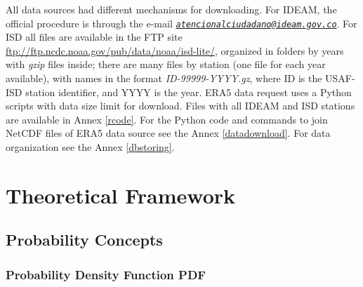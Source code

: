 \documentclass[12pt,twoside]{reedthesis}
\begin{document}
All data sources had different mechanisms for downloading. For IDEAM, the official procedure is through the e-mail \emph{\href{mailto:atencionalciudadano@ideam.gov.co}{\nolinkurl{atencionalciudadano@ideam.gov.co}}}. For ISD all files are available in the FTP site \url{ftp://ftp.ncdc.noaa.gov/pub/data/noaa/isd-lite/}, organized in folders by years with \emph{gzip} files inside; there are many files by station (one file for each year available), with names in the format \emph{ID-99999-YYYY.gz}, where ID is the USAF-ISD station identifier, and YYYY is the year. ERA5 data request uses a Python scripts with data size limit for download. Files with all IDEAM and ISD stations are available in Annex \ref{rcode}. For the Python code and commands to join NetCDF files of ERA5 data source see the Annex \ref{datadownload}. For data organization see the Annex \ref{dbstoring}.

\clearpage

\hypertarget{rmd-thefra}{%
\chapter{Theoretical Framework}\label{rmd-thefra}}

\hypertarget{probability-concepts}{%
\section{Probability Concepts}\label{probability-concepts}}

\hypertarget{probability-density-function-pdf}{%
\subsection{Probability Density Function PDF}\label{probability-density-function-pdf}}
\end{document}
